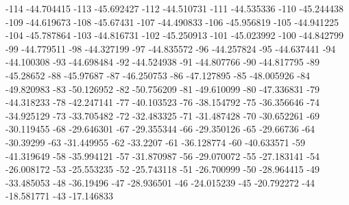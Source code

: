 -114                      -44.704415
-113                      -45.692427
-112                      -44.510731
-111                      -44.535336
-110                      -45.244438
-109                      -44.619673
-108                       -45.67431
-107                      -44.490833
-106                      -45.956819
-105                      -44.941225
-104                      -45.787864
-103                      -44.816731
-102                      -45.250913
-101                      -45.023992
-100                      -44.842799
-99                      -44.779511
-98                      -44.327199
-97                      -44.835572
-96                      -44.257824
-95                      -44.637441
-94                      -44.100308
-93                      -44.698484
-92                      -44.524938
-91                      -44.807766
-90                      -44.817795
-89                       -45.28652
-88                       -45.97687
-87                      -46.250753
-86                      -47.127895
-85                      -48.005926
-84                      -49.820983
-83                      -50.126952
-82                      -50.756209
-81                      -49.610099
-80                      -47.336831
-79                      -44.318233
-78                      -42.247141
-77                      -40.103523
-76                      -38.154792
-75                      -36.356646
-74                      -34.925129
-73                      -33.705482
-72                      -32.483325
-71                      -31.487428
-70                      -30.652261
-69                      -30.119455
-68                      -29.646301
-67                      -29.355344
-66                      -29.350126
-65                       -29.66736
-64                       -30.39299
-63                      -31.449955
-62                        -33.2207
-61                      -36.128774
-60                      -40.633571
-59                      -41.319649
-58                      -35.994121
-57                      -31.870987
-56                      -29.070072
-55                      -27.183141
-54                      -26.008172
-53                      -25.553235
-52                      -25.743118
-51                      -26.700999
-50                      -28.964415
-49                      -33.485053
-48                       -36.19496
-47                      -28.936501
-46                      -24.015239
-45                      -20.792272
-44                      -18.581771
-43                      -17.146833
